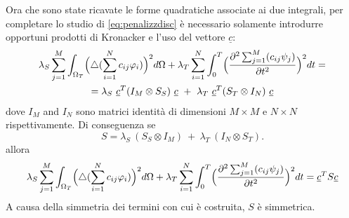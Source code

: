 \documentclass[a4paper,11pt,twoside,openright]{book}							%
\begin{document}
Ora che sono state ricavate le forme quadratiche associate ai due integrali, per completare lo studio di \ref{eq:penalizzdisc} è necessario solamente introdurre opportuni prodotti di Kronacker e l'uso del vettore $\underline c$:
\begin{multline*}
\lambda_S  \sum_{j=1}^M \int_{\Omega_T} \Bigl( \triangle(\sum_{i=1}^N  c_{ij}\varphi_i ) \Bigr)^2 d \Omega + \lambda_T \sum_{i=1}^N\int_0^T \Bigl( \frac{\partial^2 \sum_{j=1}^M(c_{ij}\psi_j) }{\partial t ^2} \Bigr)^2 dt= \\
= \lambda_S\   \underline c^T (I_M \otimes S_S)\  \underline c   \ +\  \lambda_T\  \underline c^T ( S_T \otimes I_N)\  \underline c
\end{multline*}
dove $I_M$ and $I_N$ sono matrici identità di dimensioni $M \times M$ e $N \times N$ rispettivamente.
Di conseguenza se
$$ S = \lambda_S\    (S_S \otimes I_M)   \ +\  \lambda_T\   (I_N \otimes S_T)  .$$
allora
$$
\lambda_S  \sum_{j=1}^M \int_{\Omega_T} \Bigl( \triangle(\sum_{i=1}^N  c_{ij}\varphi_i ) \Bigr)^2 d \Omega + \lambda_T \sum_{i=1}^N\int_0^T \Bigl( \frac{\partial^2 \sum_{j=1}^M(c_{ij}\psi_j) }{\partial t ^2} \Bigr)^2 dt=\underline c^T S \underline c
$$
A causa della simmetria dei termini con cui è costruita, $S$ è simmetrica.
\end{document}
